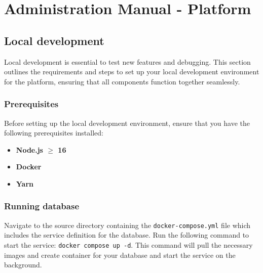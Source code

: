 \chapter{Administration Manual - Platform}
\label{attachments:admin-manual-local-development}


\section{Local development}
Local development is essential to test new features and debugging. This section outlines the requirements and steps to set up your local development environment for the platform, ensuring that all components function together seamlessly.


\subsection{Prerequisites}
Before setting up the local development environment, ensure that you have the following prerequisites installed:
\begin{itemize}
    \item \textbf{Node.js $\geq$ 16}
    \item \textbf{Docker}
    \item \textbf{Yarn}
\end{itemize}

\subsection{Running database}
Navigate to the source directory containing the \texttt{docker-compose.yml} file which includes the service definition for the database.
Run the following command to start the service:
\texttt{docker compose up -d}.
This command will pull the necessary images and create container for your database and start the service on the background.

